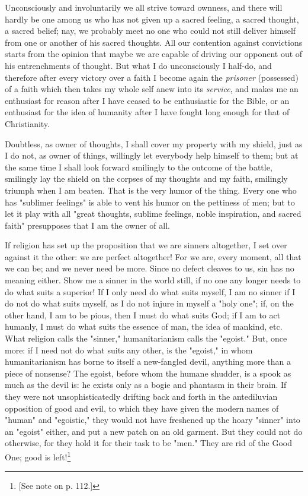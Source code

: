 \documentclass[a4paper]{book}
\begin{document}
Unconsciously and involuntarily we all strive toward ownness, and there will 
hardly be one among us who has not given up a sacred feeling, a sacred 
thought, a sacred belief; nay, we probably meet no one who could not still 
deliver himself from one or another of his sacred thoughts. All our contention 
against convictions starts from the opinion that maybe we are capable of 
driving our opponent out of his entrenchments of thought. But what I do 
unconsciously I half-do, and therefore after every victory over a faith I 
become again the \textit{prisoner} (possessed) of a faith which then takes my 
whole self anew into its \textit{service}, and makes me an enthusiast for 
reason after I have ceased to be enthusiastic for the Bible, or an enthusiast 
for the idea of humanity after I have fought long enough for that of 
Christianity.

Doubtless, as owner of thoughts, I shall cover my property with my shield, 
just as I do not, as owner of things, willingly let everybody help himself to 
them; but at the same time I shall look forward smilingly to the outcome of 
the battle, smilingly lay the shield on the corpses of my thoughts and my 
faith, smilingly triumph when I am beaten. That is the very humor of the 
thing. Every one who has "{}sublimer feelings"{} is able to vent his humor on 
the pettiness of men; but to let it play with all "{}great thoughts, sublime 
feelings, noble inspiration, and sacred faith"{} presupposes that I am the 
owner of all.

If religion has set up the proposition that we are sinners altogether, I set 
over against it the other: we are perfect altogether! For we are, every 
moment, all that we can be; and we never need be more. Since no defect cleaves 
to us, sin has no meaning either. Show me a sinner in the world still, if no 
one any longer needs to do what suits a superior! If I only need do what suits 
myself, I am no sinner if I do not do what suits myself, as I do not injure in 
myself a "{}holy one"{}; if, on the other hand, I am to be pious, then I must 
do what suits God; if I am to act humanly, I must do what suits the essence of 
man, the idea of mankind, etc. What religion calls the "{}sinner,"{} 
humanitarianism calls the "{}egoist."{} But, once more: if I need not do what 
suits any other, is the "{}egoist,"{} in whom humanitarianism has borne to 
itself a new-fangled devil, anything more than a piece of nonsense? The 
egoist, before whom the humane shudder, is a spook as much as the devil is: he 
exists only as a bogie and phantasm in their brain. If they were not 
unsophisticatedly drifting back and forth in the antediluvian opposition of 
good and evil, to which they have given the modern names of "{}human"{} and 
"{}egoistic,"{} they would not have freshened up the hoary "{}sinner"{} into 
an "{}egoist"{} either, and put a new patch on an old garment. But they could 
not do otherwise, for they hold it for their task to be "{}men."{} They are 
rid of the Good One; good is left!\footnote{[See note on p. 112.]}
\end{document}
